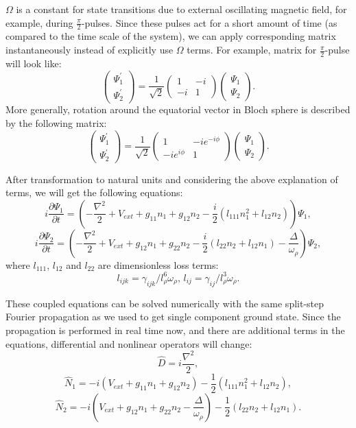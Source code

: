 \documentclass[12pt,notitlepage]{report}
\begin{document}
$\Omega$ is a constant for state transitions due to external oscillating magnetic field, for example, during $\frac{\pi}{2}$-pulses. Since these pulses act for a short amount of time (as compared to the time scale of the system), we can apply corresponding matrix instantaneously instead of explicitly use $\Omega$ terms. For example, matrix for $\frac{\pi}{2}$-pulse will look like:
\[
\begin{pmatrix}
	\Psi^\prime_1 \\	\Psi^\prime_2
\end{pmatrix} =
\frac{1}{\sqrt{2}} \begin{pmatrix}
	1 & -i \\ -i & 1
\end{pmatrix}
\begin{pmatrix}
	\Psi_1 \\ \Psi_2
\end{pmatrix}.
\]
More generally, rotation around the equatorial vector in Bloch sphere is described by the following matrix:
\begin{equation}
\label{rotation_matrix}
\begin{pmatrix}
	\Psi^\prime_1 \\	\Psi^\prime_2
\end{pmatrix} =
\frac{1}{\sqrt{2}} \begin{pmatrix}
	1 & -i e^{-i \phi} \\ -i e^{i \phi} & 1
\end{pmatrix}
\begin{pmatrix}
	\Psi_1 \\ \Psi_2
\end{pmatrix}.
\end{equation}

After transformation to natural units and considering the above explanation of terms, we will get the following equations:
\[ i \frac{\partial \Psi_1}{\partial t} = \left(
	-\frac{\nabla^2}{2} + V_{ext} +
	g_{11} n_1 + g_{12} n_2 - \frac{i}{2} (l_{111} n_1^2 + l_{12} n_2)
\right) \Psi_1, \]
\[ i \frac{\partial \Psi_2}{\partial t} = \left(
	-\frac{\nabla^2}{2} + V_{ext} +
	g_{12} n_1 + g_{22} n_2 - \frac{i}{2} (l_{22} n_2 + l_{12} n_1) -
	\frac{\Delta}{\omega_\rho}
\right) \Psi_2, \]
where $l_{111}$, $l_{12}$ and $l_{22}$ are dimensionless loss terms:
\[ l_{ijk} = \gamma_{ijk} / l_\rho^6 \omega_{\rho},\, l_{ij} = \gamma_{ij} / l_\rho^3 \omega_{\rho}. \]

These coupled equations can be solved numerically with the same split-step Fourier propagation as we used to get single component ground state. Since the propagation is performed in real time now, and there are additional terms in the equations, differential and nonlinear operators will change:
\[ \hat{D} = i \frac{\nabla^2}{2}, \]
\[ \hat{N}_1 = -i \left( V_{ext} + g_{11} n_1 + g_{12} n_2 \right) - \frac{1}{2} \left( l_{111} n_1^2 + l_{12} n_2 \right), \]
\[
\hat{N}_2 = -i \left( V_{ext} + g_{12} n_1 + g_{22} n_2 - \frac{\Delta}{\omega_\rho} \right) -
\frac{1}{2} \left( l_{22} n_2 + l_{12} n_1 \right).
\]
\end{document}
